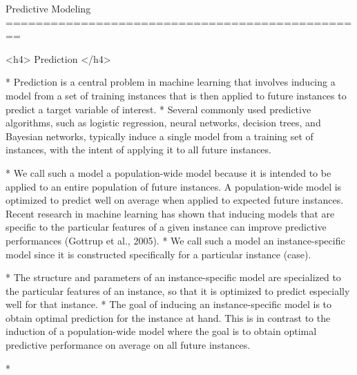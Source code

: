 Predictive Modeling
================================================

<h4> Prediction </h4>

* Prediction is a central problem in machine learning that involves inducing a model from a set of
training instances that is then applied to future instances to predict a target variable of interest.
* Several commonly used predictive algorithms, such as logistic regression, neural networks, decision
trees, and Bayesian networks, typically induce a single model from a training set of instances, with
the intent of applying it to all future instances. 


* We call such a model a population-wide model because it is intended to be applied to an entire population of future instances. A population-wide
model is optimized to predict well on average when applied to expected future instances.
Recent research in machine learning has shown that inducing models that are speciﬁc to the
particular features of a given instance can improve predictive performances (Gottrup et al., 2005).
* We call such a model an instance-speciﬁc model since it is constructed speciﬁcally for a particular
instance (case). 

* The structure and parameters of an instance-speciﬁc model are specialized to the
particular features of an instance, so that it is optimized to predict especially well for that instance.
* The goal of inducing an instance-speciﬁc model is to obtain optimal prediction for the instance at
hand. This is in contrast to the induction of a population-wide model where the goal is to obtain
optimal predictive performance on average on all future instances.

* %
